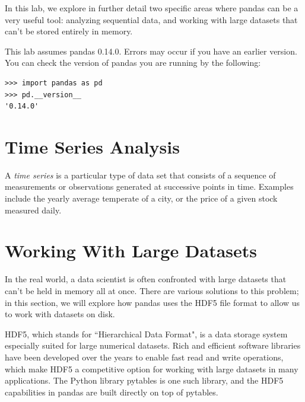 \label{lab:pandas4}
In this lab, we explore in further detail two specific areas where pandas can be a very useful tool:
analyzing sequential data, and working with large datasets that can't be stored entirely in memory.
\begin{warn}
This lab assumes pandas 0.14.0. Errors may occur if you have an earlier version.
You can check the version of pandas you are running by the following:
\begin{lstlisting}
>>> import pandas as pd
>>> pd.__version__
'0.14.0'
\end{lstlisting}
\end{warn}
\section*{Time Series Analysis}
A \emph{time series} is a particular type of data set that consists of a sequence of measurements or observations
generated at successive points in time. Examples include the yearly average temperate of a city, or
the price of a given stock measured daily.

\section*{Working With Large Datasets}
In the real world, a data scientist is often confronted with large datasets that can't be held in memory all at once.
There are various solutions to this problem; in this section, we will explore how pandas uses the HDF5 file format
to allow us to work with datasets on disk.

HDF5, which stands for ``Hierarchical Data Format", is a data storage system especially suited for large numerical datasets.
Rich and efficient software libraries have been developed over the years to enable fast read and write operations,
which make HDF5 a competitive option for working with large datasets in many applications. The Python library pytables
is one such library, and the HDF5 capabilities in pandas are built directly on top of pytables.

